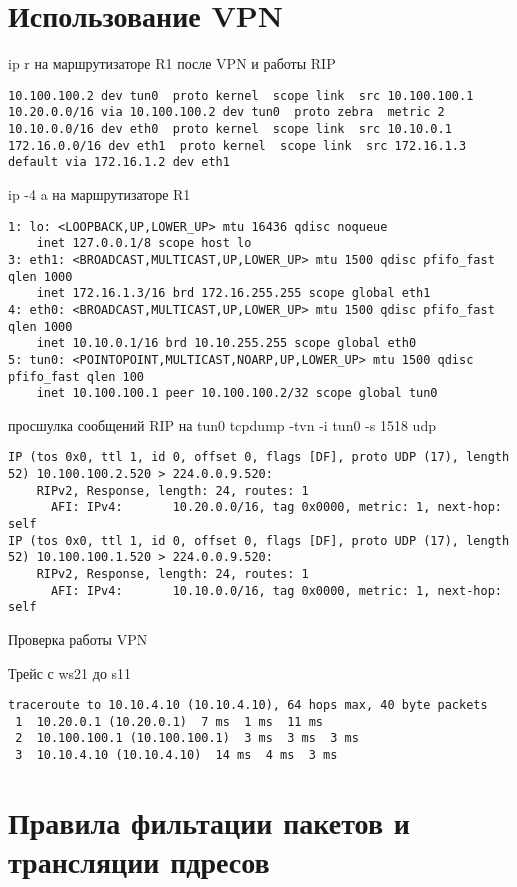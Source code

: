 \documentclass[a4paper,12pt]{article}
\begin{document}
\section{Использование VPN}
ip r на маршрутизаторе R1 после VPN и работы RIP
\begin{Verbatim}
10.100.100.2 dev tun0  proto kernel  scope link  src 10.100.100.1 
10.20.0.0/16 via 10.100.100.2 dev tun0  proto zebra  metric 2 
10.10.0.0/16 dev eth0  proto kernel  scope link  src 10.10.0.1 
172.16.0.0/16 dev eth1  proto kernel  scope link  src 172.16.1.3 
default via 172.16.1.2 dev eth1 
\end{Verbatim}

ip -4 a на маршрутизаторе R1
\begin{Verbatim}
1: lo: <LOOPBACK,UP,LOWER_UP> mtu 16436 qdisc noqueue 
    inet 127.0.0.1/8 scope host lo
3: eth1: <BROADCAST,MULTICAST,UP,LOWER_UP> mtu 1500 qdisc pfifo_fast qlen 1000
    inet 172.16.1.3/16 brd 172.16.255.255 scope global eth1
4: eth0: <BROADCAST,MULTICAST,UP,LOWER_UP> mtu 1500 qdisc pfifo_fast qlen 1000
    inet 10.10.0.1/16 brd 10.10.255.255 scope global eth0
5: tun0: <POINTOPOINT,MULTICAST,NOARP,UP,LOWER_UP> mtu 1500 qdisc pfifo_fast qlen 100
    inet 10.100.100.1 peer 10.100.100.2/32 scope global tun0
\end{Verbatim}

просшулка сообщений RIP на tun0
tcpdump -tvn -i tun0 -s 1518 udp
\begin{Verbatim}
IP (tos 0x0, ttl 1, id 0, offset 0, flags [DF], proto UDP (17), length 52) 10.100.100.2.520 > 224.0.0.9.520: 
	RIPv2, Response, length: 24, routes: 1
	  AFI: IPv4:       10.20.0.0/16, tag 0x0000, metric: 1, next-hop: self
IP (tos 0x0, ttl 1, id 0, offset 0, flags [DF], proto UDP (17), length 52) 10.100.100.1.520 > 224.0.0.9.520: 
	RIPv2, Response, length: 24, routes: 1
	  AFI: IPv4:       10.10.0.0/16, tag 0x0000, metric: 1, next-hop: self
\end{Verbatim}

Проверка работы VPN

Трейс с ws21 до s11
\begin{Verbatim}
traceroute to 10.10.4.10 (10.10.4.10), 64 hops max, 40 byte packets
 1  10.20.0.1 (10.20.0.1)  7 ms  1 ms  11 ms
 2  10.100.100.1 (10.100.100.1)  3 ms  3 ms  3 ms
 3  10.10.4.10 (10.10.4.10)  14 ms  4 ms  3 ms
\end{Verbatim}

\section{Правила фильтации пакетов и трансляции пдресов}
\end{document}
